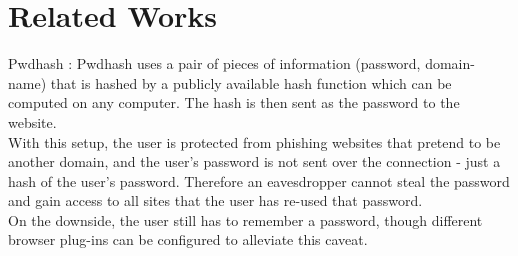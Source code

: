 \documentclass[11pt]{article}
\begin{document}
\section{Related Works}
Pwdhash \cite{pwdhash}:
Pwdhash uses a pair of pieces of information (password, domain-name) that is hashed by a publicly available hash function which can be computed on any computer. The hash is then sent as the password to the website.\\
	With this setup, the user is protected from phishing websites that pretend to be another domain, and the user’s password is not sent over the connection - just a hash of the user's password. Therefore an eavesdropper cannot steal the password and gain access to all sites that the user has re-used that password.\\
	On the downside, the user still has to remember a password, though different browser plug-ins can be configured to alleviate this caveat.\\
\end{document}
